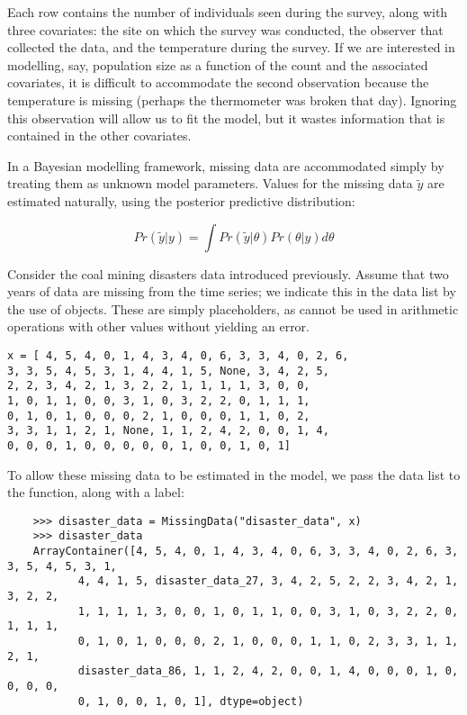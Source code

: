 Each row contains the number of individuals seen during the survey, along with three covariates: the site on which the survey was conducted, the observer that collected the data, and the temperature during the survey. If we are interested in modelling, say, population size as a function of the count and the associated covariates, it is difficult to accommodate the second observation because the temperature is missing (perhaps the thermometer was broken that day). Ignoring this observation will allow us to fit the model, but it wastes information that is contained in the other covariates. 

In a Bayesian modelling framework, missing data are accommodated simply by treating them as unknown model parameters. Values for the missing data $\tilde{y}$ are estimated naturally, using the posterior predictive distribution:

\begin{equation}
	Pr(\tilde{y}|y) = \int Pr(\tilde{y}|\theta) Pr(\theta|y) d\theta
\end{equation}

Consider the coal mining disasters data introduced previously. Assume that two years of data are missing from the time series; we indicate this in the data list by the use of  objects. These are simply placeholders, as  cannot be used in arithmetic operations with other values without yielding an error.

\begin{verbatim}
x = [ 4, 5, 4, 0, 1, 4, 3, 4, 0, 6, 3, 3, 4, 0, 2, 6,
3, 3, 5, 4, 5, 3, 1, 4, 4, 1, 5, None, 3, 4, 2, 5,
2, 2, 3, 4, 2, 1, 3, 2, 2, 1, 1, 1, 1, 3, 0, 0,
1, 0, 1, 1, 0, 0, 3, 1, 0, 3, 2, 2, 0, 1, 1, 1,
0, 1, 0, 1, 0, 0, 0, 2, 1, 0, 0, 0, 1, 1, 0, 2,
3, 3, 1, 1, 2, 1, None, 1, 1, 2, 4, 2, 0, 0, 1, 4,
0, 0, 0, 1, 0, 0, 0, 0, 0, 1, 0, 0, 1, 0, 1]
\end{verbatim}

To allow these missing data to be estimated in the model, we pass the data list to the  function, along with a label:

\begin{verbatim}
	>>> disaster_data = MissingData("disaster_data", x)
	>>> disaster_data
	ArrayContainer([4, 5, 4, 0, 1, 4, 3, 4, 0, 6, 3, 3, 4, 0, 2, 6, 3, 3, 5, 4, 5, 3, 1,
	       4, 4, 1, 5, disaster_data_27, 3, 4, 2, 5, 2, 2, 3, 4, 2, 1, 3, 2, 2,
	       1, 1, 1, 1, 3, 0, 0, 1, 0, 1, 1, 0, 0, 3, 1, 0, 3, 2, 2, 0, 1, 1, 1,
	       0, 1, 0, 1, 0, 0, 0, 2, 1, 0, 0, 0, 1, 1, 0, 2, 3, 3, 1, 1, 2, 1,
	       disaster_data_86, 1, 1, 2, 4, 2, 0, 0, 1, 4, 0, 0, 0, 1, 0, 0, 0, 0,
	       0, 1, 0, 0, 1, 0, 1], dtype=object)
\end{verbatim}

